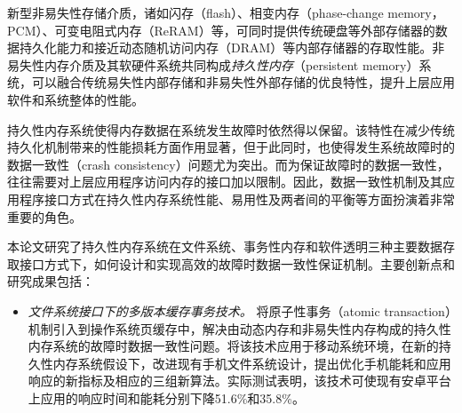 \begin{cabstract}

新型非易失性存储介质，诸如闪存（flash）、相变内存（phase-change memory，PCM）、可变电阻式内存（ReRAM）等，可同时提供传统硬盘等外部存储器的数据持久化能力和接近动态随机访问内存（DRAM）等内部存储器的存取性能。非易失性内存介质及其软硬件系统共同构成\emph{持久性内存}（persistent memory）系统，可以融合传统易失性内部存储和非易失性外部存储的优良特性，提升上层应用软件和系统整体的性能。

持久性内存系统使得内存数据在系统发生故障时依然得以保留。该特性在减少传统持久化机制带来的性能损耗方面作用显著，但于此同时，也使得发生系统故障时的数据一致性（crash consistency）问题尤为突出。而为保证故障时的数据一致性，往往需要对上层应用程序访问内存的接口加以限制。因此，数据一致性机制及其应用程序接口方式在持久性内存系统性能、易用性及两者间的平衡等方面扮演着非常重要的角色。



本论文研究了持久性内存系统在文件系统、事务性内存和软件透明三种主要数据存取接口方式下，如何设计和实现高效的故障时数据一致性保证机制。主要创新点和研究成果包括：

\begin{itemize}
\item \emph{文件系统接口下的多版本缓存事务技术。}
将原子性事务（atomic transaction）机制引入到操作系统页缓存中，解决由动态内存和非易失性内存构成的持久性内存系统的故障时数据一致性问题。将该技术应用于移动系统环境，在新的持久性内存系统假设下，改进现有手机文件系统设计，提出优化手机能耗和应用响应的新指标及相应的三组新算法。实际测试表明，该技术可使现有安卓平台上应用的响应时间和能耗分别下降51.6\%和35.8\%。


\end{itemize}
\end{cabstract}
